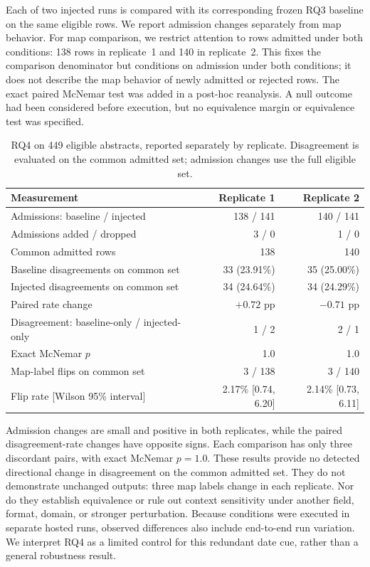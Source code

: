 \documentclass[11pt]{article}
\begin{document}
Each of two injected runs is compared with its corresponding frozen RQ3
baseline on the same eligible rows. We report admission changes separately
from map behavior. For map comparison, we restrict attention to rows admitted
under both conditions: 138 rows in replicate~1 and 140 in replicate~2.
This fixes the comparison denominator but conditions on admission under both
conditions; it does not describe the map behavior of newly admitted or
rejected rows. The exact paired McNemar test was added in a post-hoc
reanalysis. A null outcome had been considered before execution, but no
equivalence margin or equivalence test was specified.

\begin{table}[ht]
\centering
\small
\caption{RQ4 on 449 eligible abstracts, reported separately by replicate.
Disagreement is evaluated on the common admitted set; admission changes use
the full eligible set.}
\begin{tabularx}{\linewidth}{@{}Xrr@{}}
\toprule
Measurement & Replicate 1 & Replicate 2 \\
\midrule
Admissions: baseline / injected & 138 / 141 & 140 / 141 \\
Admissions added / dropped & 3 / 0 & 1 / 0 \\
Common admitted rows & 138 & 140 \\
Baseline disagreements on common set & 33 (23.91\%) & 35 (25.00\%) \\
Injected disagreements on common set & 34 (24.64\%) & 34 (24.29\%) \\
Paired rate change & $+0.72$ pp & $-0.71$ pp \\
Disagreement: baseline-only / injected-only & 1 / 2 & 2 / 1 \\
Exact McNemar $p$ & 1.0 & 1.0 \\
Map-label flips on common set & 3 / 138 & 3 / 140 \\
Flip rate [Wilson 95\% interval] & 2.17\% [0.74, 6.20] & 2.14\% [0.73, 6.11] \\
\bottomrule
\end{tabularx}
\end{table}

Admission changes are small and positive in both replicates, while the
paired disagreement-rate changes have opposite signs. Each comparison has
only three discordant pairs, with exact McNemar $p=1.0$. These results provide
no detected directional change in disagreement on the common admitted set.
They do not demonstrate unchanged outputs: three map labels change in each
replicate. Nor do they establish equivalence or rule out context sensitivity
under another field, format, domain, or stronger perturbation. Because
conditions were executed in separate hosted runs, observed differences also
include end-to-end run variation. We interpret RQ4 as a limited control for
this redundant date cue, rather than a general robustness result.
\end{document}
